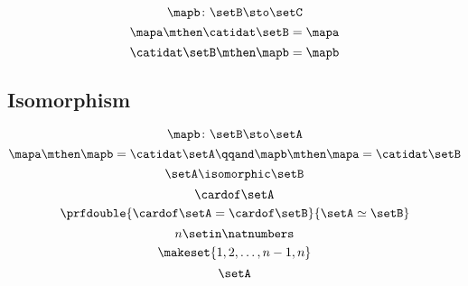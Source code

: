 {\begin{forslides}
\begin{equation}
        \end{equation}
        \begin{equation}
            \label{eq:slides_session2_145}
            \mapb \colon \setB \sto \setC
        \end{equation}
        \begin{equation}
            \label{eq:slides_session2_146}
            \mapa \mthen \catidat\setB = \mapa
        \end{equation}
        \begin{equation}
            \label{eq:slides_session2_147}
            \catidat\setB \mthen \mapb = \mapb
        \end{equation}

        \subsection{Isomorphism}

        \begin{equation}
            \label{eq:slides_session2_148}
            \mapb \colon \setB \sto \setA
        \end{equation}
        \begin{equation}
            \label{eq:slides_session2_149}
            \mapa \mthen \mapb = \catidat\setA
            \qqand
            \mapb \mthen \mapa = \catidat\setB
        \end{equation}
        \begin{equation}
            \label{eq:slides_session2_150}
            \setA \isomorphic \setB
        \end{equation}
        \begin{equation}
            \label{eq:slides_session2_151}
            \cardof \setA
        \end{equation}
        \begin{equation}
            \label{eq:slides_session2_152}
            \prfdouble{
                \cardof \setA   = \cardof \setB
            }{
                \setA \simeq \setB
            }
        \end{equation}
        \begin{equation}
            \label{eq:slides_session2_153}
            n \setin \natnumbers
        \end{equation}
        \begin{equation}
            \label{eq:slides_session2_154}
            \makeset{1,2, \dots, n-1, n}
        \end{equation}
        \begin{equation}
            \label{eq:slides_session2_155}
            \setA
        \end{equation}


\end{forslides}}
